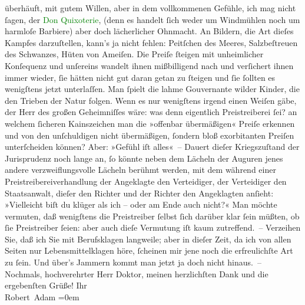                     überhäuft, mit gutem Willen, aber in dem vollkommenen Gefühle, ich mag nicht
                    ſagen, der \textcolor{green}{Don Quixoterie}{},
                         (denn es handelt ſich weder um
                    Windmühlen noch um harmloſe Barbiere) aber doch lächerlicher Ohnmacht. An
                    Bildern, die Art dieſes Kampfes darzuſtellen, kann’s ja nicht fehlen: Peitſchen
                    des Meeres, Salzbeſtreuen des Schwanzes, Hüten von Ameiſen. Die Preiſe ſteigen
                    mit unheimlicher Konſequenz und unſereins wandelt ihnen mißbilligend nach {\pb}und verſichert ihnen immer wieder, ſie hätten
                    nicht gut daran getan zu ſteigen und ſie ſollten es wenigſtens jetzt
                    unterlaſſen. Man ſpielt die lahme Gouvernante wilder Kinder, die den Trieben der
                    Natur folgen. Wenn es nur wenigſtens irgend einen Weiſen gäbe, der Herr des
                    großen Geheimniſſes wäre: was denn eigentlich Preistreiberei ſei? an welchem
                    ſicheren Kainszeichen man die »offenbar übermäßigen« Preiſe erkennen und von den
                    unſchuldigen nicht übermäßigen, ſondern bloß exorbitanten Preiſen unterſcheiden
                    können? Aber: »Gefühl iſt alles« –\pend
           \pstart
           Dauert dieſer Kriegszuſtand der Jurisprudenz noch lange an, ſo könnte neben dem
                    Lächeln der Auguren jenes andere verzweiflungsvolle Lächeln berühmt werden, mit
                    dem während einer Preistreibereiverhandlung der Angeklagte den Verteidiger, der
                    Verteidiger den Staatsanwalt, dieſer den Richter und der Richter den Angeklagten
                    anſieht: »Vielleicht biſt du {\pb}klüger als ich –
                    oder am Ende auch nicht?« Man möchte vermuten, daß wenigſtens die Preistreiber
                        \introOben{}\introOben{}{ }ſelbst \introOben{}ſich\introOben{} darüber
                    klar ſein müßten, ob ſie Preistreiber ſeien: aber auch dieſe Vermutung iſt  kaum zutreffend. –\pend
           \pstart
           Verzeihen Sie, daß ich Sie mit Berufsklagen langweile; aber in dieſer Zeit, da
                    ich von allen Seiten nur Lebensmittelklagen höre, ſcheinen mir jene noch die
                    erfreulichſte Art zu ſein. Und über’s Jammern kommt man jetzt ja doch nicht
                    hinaus. –\pend
           \pstart
           Nochmals, hochverehrter Herr Doktor, meinen herzlichſten Dank und die ergebenſten
                    Grüße!\pend
           \pstart
           Ihr{\\[\baselineskip]}\spacefill\mbox{Robert Adam}\pend
           \leftskip=0em{}\endnumbering{}  
      